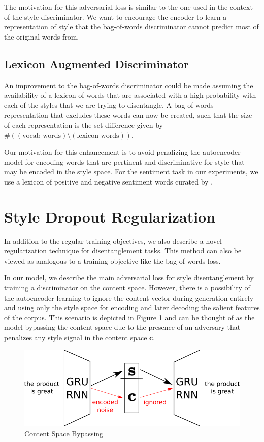 The motivation for this adversarial loss is similar to the one used in the context of the style discriminator. We want to encourage the encoder to learn a representation of style that the bag-of-words discriminator cannot predict most of the original words from.

\subsection{Lexicon Augmented Discriminator}

An improvement to the bag-of-words discriminator could be made assuming the availability of a lexicon of words that are associated with a high probability with each of the styles that we are trying to disentangle.  A bag-of-words representation that excludes these words can now be created, such that the size of each representation is the set difference given by $\# ((\text{vocab words}) \setminus (\text{lexicon words}))$.

Our motivation for this enhancement is to avoid penalizing the autoencoder model for encoding words that are pertinent and discriminative for style that may be encoded in the style space. For the sentiment task in our experiments, we use a lexicon of positive and negative sentiment words curated by \cite{hu2004mining}.


\section{Style Dropout Regularization} \label{sec:style-dropout}

In addition to the regular training objectives, we also describe a novel regularization technique for disentanglement tasks. This method can also be viewed as analogous to a training objective like the bag-of-words loss.

In our model, we describe the main adversarial loss for style disentanglement by training a discriminator on the content space. However, there is a possibility of the autoencoder learning to ignore the content vector during generation entirely and using only the style space for encoding and later decoding the salient features of the corpus. This scenario is depicted in Figure \ref{fig:model-content-bypass} and can be thought of as the model bypassing the content space due to the presence of an adversary that penalizes any style signal in the content space $\bm c$.

\begin{figure}[ht]
	\centering
	\includegraphics[width=\linewidth]{images/model-content-bypass}
	\caption{Content Space Bypassing}
	\label{fig:model-content-bypass}
\end{figure}

